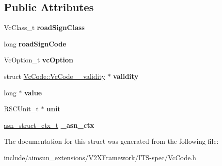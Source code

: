 \subsection*{Public Attributes}
\begin{DoxyCompactItemize}
\item 
Vc\+Class\+\_\+t {\bfseries road\+Sign\+Class}\hypertarget{structVcCode_ad38430a2122ac36c32a99513a28dc96d}{}\label{structVcCode_ad38430a2122ac36c32a99513a28dc96d}

\item 
long {\bfseries road\+Sign\+Code}\hypertarget{structVcCode_ae09f5f9a120164b58a0c3bce557651c1}{}\label{structVcCode_ae09f5f9a120164b58a0c3bce557651c1}

\item 
Vc\+Option\+\_\+t {\bfseries vc\+Option}\hypertarget{structVcCode_a5662d2f24a661fa6412ba7724dd59f01}{}\label{structVcCode_a5662d2f24a661fa6412ba7724dd59f01}

\item 
struct \hyperlink{structVcCode_1_1VcCode____validity}{Vc\+Code\+::\+Vc\+Code\+\_\+\+\_\+validity} $\ast$ {\bfseries validity}\hypertarget{structVcCode_aa4d66c9932f810b7f74b10f0c9146d5e}{}\label{structVcCode_aa4d66c9932f810b7f74b10f0c9146d5e}

\item 
long $\ast$ {\bfseries value}\hypertarget{structVcCode_a8699d143c64dd92d756d0e9a848557d2}{}\label{structVcCode_a8699d143c64dd92d756d0e9a848557d2}

\item 
R\+S\+C\+Unit\+\_\+t $\ast$ {\bfseries unit}\hypertarget{structVcCode_a2e6fb331600055a8a9adb51c5e551e43}{}\label{structVcCode_a2e6fb331600055a8a9adb51c5e551e43}

\item 
\hyperlink{structasn__struct__ctx__s}{asn\+\_\+struct\+\_\+ctx\+\_\+t} {\bfseries \+\_\+asn\+\_\+ctx}\hypertarget{structVcCode_a84bc287b54353cbe8be8b2186d02d83f}{}\label{structVcCode_a84bc287b54353cbe8be8b2186d02d83f}

\end{DoxyCompactItemize}


The documentation for this struct was generated from the following file\+:\begin{DoxyCompactItemize}
\item 
include/aimsun\+\_\+extensions/\+V2\+X\+Framework/\+I\+T\+S-\/spec/Vc\+Code.\+h\end{DoxyCompactItemize}
